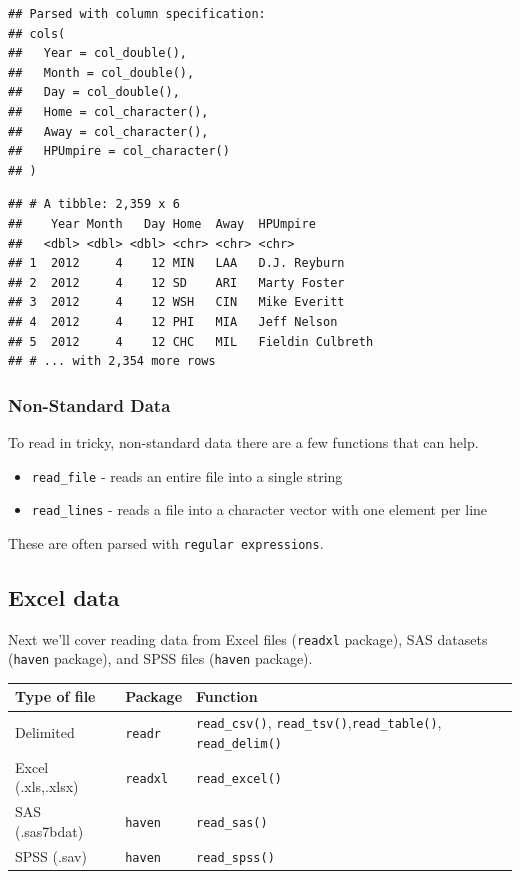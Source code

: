 \documentclass[
]{book}
\theoremstyle{definition}
\theoremstyle{definition}
\theoremstyle{definition}
\theoremstyle{remark}
\begin{document}
\begin{verbatim}
## Parsed with column specification:
## cols(
##   Year = col_double(),
##   Month = col_double(),
##   Day = col_double(),
##   Home = col_character(),
##   Away = col_character(),
##   HPUmpire = col_character()
## )
\end{verbatim}

\begin{verbatim}
## # A tibble: 2,359 x 6
##    Year Month   Day Home  Away  HPUmpire        
##   <dbl> <dbl> <dbl> <chr> <chr> <chr>           
## 1  2012     4    12 MIN   LAA   D.J. Reyburn    
## 2  2012     4    12 SD    ARI   Marty Foster    
## 3  2012     4    12 WSH   CIN   Mike Everitt    
## 4  2012     4    12 PHI   MIA   Jeff Nelson     
## 5  2012     4    12 CHC   MIL   Fieldin Culbreth
## # ... with 2,354 more rows
\end{verbatim}

\hypertarget{non-standard-data-1}{%
\subsubsection{Non-Standard Data}\label{non-standard-data-1}}

To read in tricky, non-standard data there are a few functions that can help.

\begin{itemize}
\item
  \texttt{read\_file} - reads an entire file into a single string
\item
  \texttt{read\_lines} - reads a file into a character vector with one element per line
\end{itemize}

These are often parsed with \texttt{regular\ expressions}.

\hypertarget{excel-data-1}{%
\subsection{Excel data}\label{excel-data-1}}

Next we'll cover reading data from Excel files (\texttt{readxl} package), SAS datasets (\texttt{haven} package), and SPSS files (\texttt{haven} package).

\begin{longtable}[]{@{}lll@{}}
\toprule
Type of file & Package & Function\tabularnewline
\midrule
\endhead
Delimited & \texttt{readr} & \texttt{read\_csv()}, \texttt{read\_tsv()},\texttt{read\_table()}, \texttt{read\_delim()}\tabularnewline
Excel (.xls,.xlsx) & \texttt{readxl} & \texttt{read\_excel()}\tabularnewline
SAS (.sas7bdat) & \texttt{haven} & \texttt{read\_sas()}\tabularnewline
SPSS (.sav) & \texttt{haven} & \texttt{read\_spss()}\tabularnewline
\bottomrule
\end{longtable}
\end{document}
